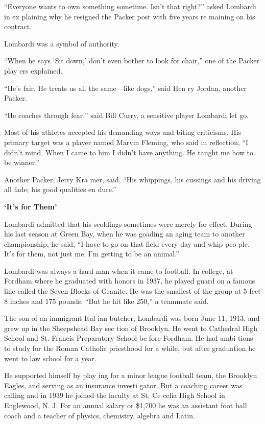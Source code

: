 ``Everyone wants to own something sometime. Isn't that right?'' asked
Lombardi in ex plaining why he resigned the Packer post with five years
re maining on his contract.

Lombardi was a symbol of authority.

``When he says `Sit down,' don't even bother to look for chair,'' one of
the Packer play ers explained.

``He's fair. He treats us all the same---like dogs,'' said Hen ry
Jordan, another Packer.

``He coaches through fear,'' said Bill Curry, a sensitive player
Lombardi let go.

Most of his athletes accepted his demanding ways and biting criticisms.
His primary target was a player named Marvin Fleming, who said in
reflection, ``I didn't mind. When I came to him I didn't have anything.
He taught me how to be winner.''

Another Packer, Jerry Kra mer, said, ``His whippings, his cussings and
his driving all fade; his good qualities en dure.''

\textbf{`It's for Them'}

Lombardi admitted that his scoldings sometimes were merely for effect.
During his last season at Green Bay, when he was goading an aging team
to another championship, he said, ``I have to go on that field every day
and whip peo ple. It's for them, not just me. I'm getting to be an
animal.''

Lombardi was always a hard man when it came to football. In college, at
Fordham where he graduated with honors in 1937, he played guard on a
famous line called the Seven Blocks of Granite. He was the smallest of
the group at 5 feet 8 inches and 175 pounds. ``But he hit like 250,'' a
teammate said.

The son of an immigrant Ital ian butcher, Lombardi was born June 11,
1913, and grew up in the Sheepshead Bay sec tion of Brooklyn. He went to
Cathedral High School and St. Francis Preparatory School be fore
Fordham. He had ambi tions to study for the Roman Catholic priesthood
for a while, but after graduation he went to law school for a year.

He supported himself by play ing for a minor league football team, the
Brooklyn Eagles, and serving as an insurance investi gator. But a
coaching career was calling and in 1939 he joined the faculty at St. Ce
celia High School in Englewood, N. J. For an annual salary or \$1,700 he
was an assistant foot ball coach and a teacher of physics, chemistry,
algebra and Latin.

